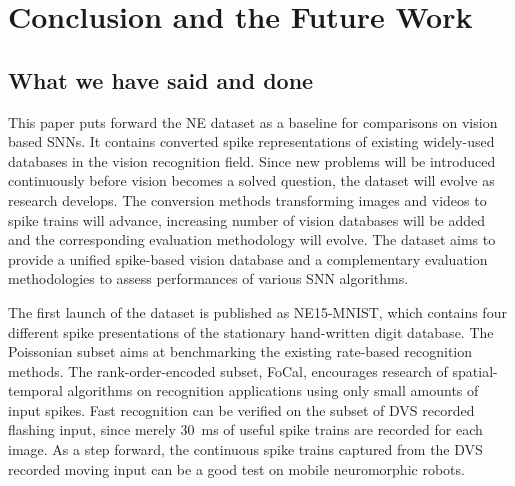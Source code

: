 \section{Conclusion and the Future Work}
\label{sec:summ}
\subsection{What we have said and done}
%
%

This paper puts forward the NE dataset as a baseline for comparisons on vision based SNNs.
It contains converted spike representations of existing widely-used databases in the vision recognition field.
Since new problems will be introduced continuously before vision becomes a solved question, the dataset will evolve as research develops. 
The conversion methods transforming images and videos to spike trains will advance, increasing number of vision databases will be added and the corresponding evaluation methodology will evolve.
The dataset aims to provide a unified spike-based vision database and a complementary evaluation methodologies to assess performances of various SNN algorithms.

The first launch of the dataset is published as NE15-MNIST, which contains four different spike presentations of the stationary hand-written digit database.
The Poissonian subset aims at benchmarking the existing rate-based recognition methods.
The rank-order-encoded subset, FoCal, encourages research of spatial-temporal algorithms on recognition applications using only small amounts of input spikes.
Fast recognition can be verified on the subset of DVS recorded flashing input, since merely 30~ms of useful spike trains are recorded for each image.
As a step forward, the continuous spike trains captured from the DVS recorded moving input can be a good test on mobile neuromorphic robots.

